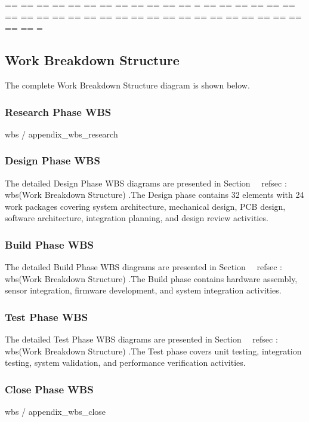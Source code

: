     == == == == == == == == == == == ==
    = %
      == == == == == == == == == == == == == == == == == == == == == == == == ==
      == ==
    =

\subsection {
  Work Breakdown Structure
}
\label{app : wbs}

The complete Work Breakdown Structure diagram is shown below.

\label {
fig:
  wbs_full
}
\subsubsection { Research Phase WBS }
\label {
app:
  wbs_research
}

 { wbs / appendix_wbs_research }

\subsubsection { Design Phase WBS }
\label{app : wbs_design}

The detailed Design Phase WBS diagrams are presented in Section ~\
ref{sec : wbs}(Work Breakdown Structure)
    .The Design phase contains 32 elements with
    24 work packages covering system architecture,
    mechanical design, PCB design, software architecture, integration planning,
    and design review activities.

\subsubsection {
  Build Phase WBS
}
\label{app : wbs_build}

The detailed Build Phase WBS diagrams are presented in Section ~\
ref{sec : wbs}(Work Breakdown Structure)
    .The Build phase contains hardware assembly,
    sensor integration, firmware development,
    and system integration activities.

\subsubsection {
  Test Phase WBS
}
\label{app : wbs_test}

The detailed Test Phase WBS diagrams are presented in Section ~\
ref{sec : wbs}(Work Breakdown Structure)
    .The Test phase covers unit testing,
    integration testing, system validation,
    and performance verification activities.

\subsubsection {
  Close Phase WBS
}
\label {
app:
  wbs_close
}

 { wbs / appendix_wbs_close }
